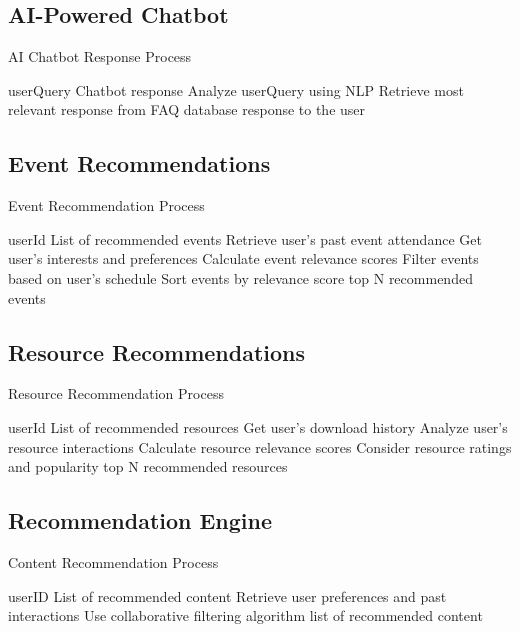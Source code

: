 \subsection{AI-Powered Chatbot}
\begin{algorithm}[H]
\caption{AI Chatbot Response Process}\label{alg:chatbot}
\begin{algorithmic}[1]
\Require userQuery
\Ensure Chatbot response
\State Analyze userQuery using NLP
\State Retrieve most relevant response from FAQ database
\State \Return response to the user
\end{algorithmic}
\end{algorithm}

\subsection{Event Recommendations}
\begin{algorithm}[H]
\caption{Event Recommendation Process}\label{alg:recommendations}
\begin{algorithmic}[1]
\Require userId
\Ensure List of recommended events
\State Retrieve user's past event attendance
\State Get user's interests and preferences
\State Calculate event relevance scores
\State Filter events based on user's schedule
\State Sort events by relevance score
\State \Return top N recommended events
\end{algorithmic}
\end{algorithm}

\subsection{Resource Recommendations}
\begin{algorithm}[H]
\caption{Resource Recommendation Process}\label{alg:resource_recommendations}
\begin{algorithmic}[1]
\Require userId
\Ensure List of recommended resources
\State Get user's download history
\State Analyze user's resource interactions
\State Calculate resource relevance scores
\State Consider resource ratings and popularity
\State \Return top N recommended resources
\end{algorithmic}
\end{algorithm}

\subsection{Recommendation Engine}
\begin{algorithm}[H]
\caption{Content Recommendation Process}\label{alg:recommendation}
\begin{algorithmic}[1]
\Require userID
\Ensure List of recommended content
\State Retrieve user preferences and past interactions
\State Use collaborative filtering algorithm
\State \Return list of recommended content
\end{algorithmic}
\end{algorithm}

